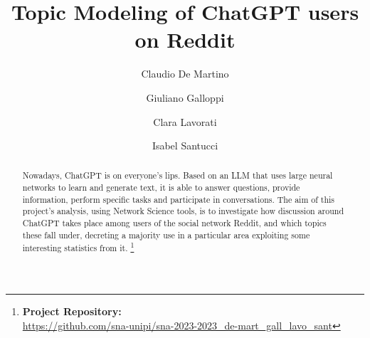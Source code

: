 \documentclass[sigchi]{acmart}
\begin{document}
%
\title{Topic Modeling of ChatGPT users on Reddit}

%
\author{Claudio De Martino}

\author{Giuliano Galloppi}

\author{Clara Lavorati}

\author{Isabel Santucci}


\renewcommand{\shortauthors}{Topic Modeling of ChatGPT users on Reddit}


\begin{abstract}
Nowadays, ChatGPT is on everyone's lips. Based on an LLM that uses large neural networks to learn and generate text, it is able to answer questions, provide information, perform specific tasks and participate in conversations. The aim of this project's analysis, using Network Science tools, is to investigate how discussion around ChatGPT takes place among users of the social network Reddit, and which topics these fall under, decreting a majority use in a particular area exploiting some interesting statistics from it. \footnote{
{\bf Project Repository:}\\
\url{https://github.com/sna-unipi/sna-2023-2023_de-mart_gall_lavo_sant}}

\end{abstract}


%


%
\maketitle
\end{document}
